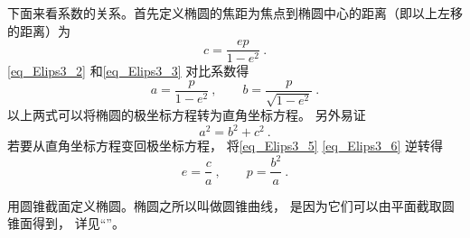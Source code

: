 下面来看系数的关系。首先定义椭圆的焦距为焦点到椭圆中心的距离（即以上左移的距离）为
\begin{equation}\label{eq_Elips3_5}
c = \frac{ep}{1 - e^2}~.
\end{equation}
\autoref{eq_Elips3_2} 和\autoref{eq_Elips3_3} 对比系数得
\begin{equation}\label{eq_Elips3_6}
a = \frac{p}{1 - e^2}~, \qquad b = \frac{p}{\sqrt {1 - e^2} }~.
\end{equation}
以上两式可以将椭圆的极坐标方程转为直角坐标方程。 另外易证
\begin{equation}\label{eq_Elips3_7}
a^2 = b^2 + c^2~.
\end{equation}
若要从直角坐标方程变回极坐标方程， 将\autoref{eq_Elips3_5} \autoref{eq_Elips3_6} 逆转得
\begin{equation}\label{eq_Elips3_8}
e = \frac{c}{a}~,\qquad
p = \frac{b^2}{a}~.
\end{equation}


用圆锥截面定义椭圆。椭圆之所以叫做圆锥曲线， 是因为它们可以由平面截取圆锥面得到， 详见“”。


